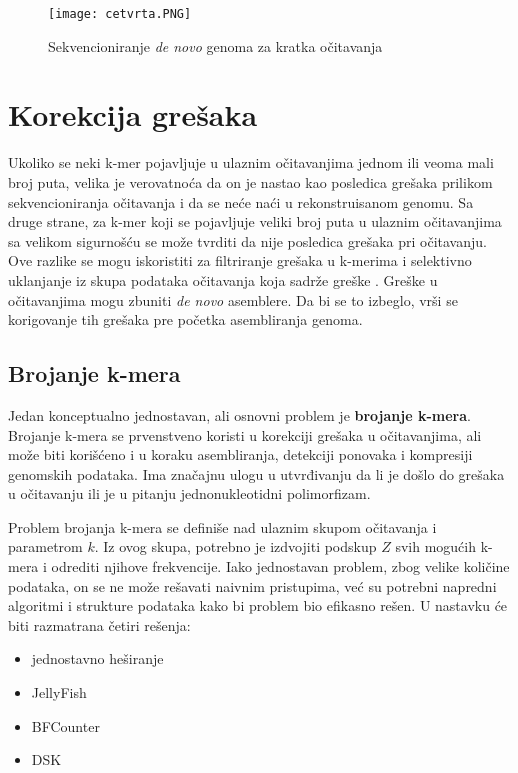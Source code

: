 \documentclass[12pt,oneside]{memoir}
\begin{document}
\begin{figure}[!ht]
  \centering
  \texttt{[image: cetvrta.PNG]}
  \caption{Sekvencioniranje \textit{de novo} genoma za kratka očitavanja \cite{WingKinSung}}
  \label{fig:4}
\end{figure}

\section{Korekcija grešaka}
\label{poglavlje:korekcijaGresaka}

Ukoliko se neki k-mer pojavljuje u ulaznim očitavanjima jednom ili veoma mali broj puta, velika je verovatnoća da on je nastao kao posledica grešaka prilikom sekvencioniranja očitavanja i da se neće naći u rekonstruisanom genomu. Sa druge strane, za k-mer koji se pojavljuje veliki broj puta u ulaznim očitavanjima sa velikom sigurnošću se može tvrditi da nije posledica grešaka pri očitavanju. Ove razlike se mogu iskoristiti za filtriranje grešaka u k-merima i selektivno uklanjanje iz skupa podataka očitavanja koja sadrže greške \cite{WingKinSung}. 
Greške u očitavanjima mogu zbuniti \textit{de novo} asemblere. Da bi se to izbeglo, vrši se korigovanje tih grešaka pre početka asembliranja genoma.

\subsection{Brojanje k-mera}

Jedan konceptualno jednostavan, ali osnovni problem je \textbf{brojanje k-mera}. Brojanje k-mera se prvenstveno koristi u korekciji grešaka u očitavanjima, ali može biti korišćeno i u koraku asembliranja, detekciji ponovaka i kompresiji genomskih podataka. Ima značajnu ulogu u utvrđivanju da li je došlo do grešaka u očitavanju ili je u pitanju jednonukleotidni polimorfizam. 

Problem brojanja k-mera se definiše nad ulaznim skupom očitavanja i parametrom $k$. Iz ovog skupa, potrebno je izdvojiti podskup $Z$ svih mogućih k-mera i odrediti njihove frekvencije. Iako jednostavan problem, zbog velike količine podataka, on se ne može rešavati naivnim pristupima, već su potrebni napredni algoritmi i strukture podataka kako bi problem bio efikasno rešen. U nastavku će biti razmatrana četiri rešenja:
\begin{itemize}
\itemsep0em
    \item {jednostavno heširanje}
    \item {JellyFish}
    \item {BFCounter}
    \item {DSK}
\end{itemize}
\end{document}
